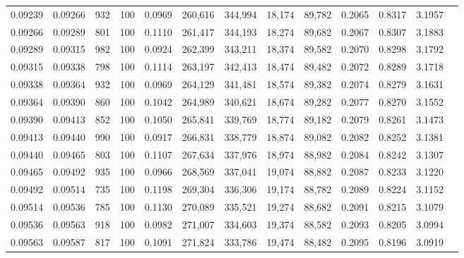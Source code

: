 \begin{tabular}{rrrrrrrrrrrrr}
0.09239 & 0.09266 &   932 & 100 &                                     0.0969 & 260,616 & 344,994 &  18,174 &  89,782 & 0.2065 & 0.8317 & 3.1957 \\
0.09266 & 0.09289 &   801 & 100 &                                     0.1110 & 261,417 & 344,193 &  18,274 &  89,682 & 0.2067 & 0.8307 & 3.1883 \\
0.09289 & 0.09315 &   982 & 100 &                                     0.0924 & 262,399 & 343,211 &  18,374 &  89,582 & 0.2070 & 0.8298 & 3.1792 \\
0.09315 & 0.09338 &   798 & 100 &                                     0.1114 & 263,197 & 342,413 &  18,474 &  89,482 & 0.2072 & 0.8289 & 3.1718 \\
0.09338 & 0.09364 &   932 & 100 &                                     0.0969 & 264,129 & 341,481 &  18,574 &  89,382 & 0.2074 & 0.8279 & 3.1631 \\
0.09364 & 0.09390 &   860 & 100 &                                     0.1042 & 264,989 & 340,621 &  18,674 &  89,282 & 0.2077 & 0.8270 & 3.1552 \\
0.09390 & 0.09413 &   852 & 100 &                                     0.1050 & 265,841 & 339,769 &  18,774 &  89,182 & 0.2079 & 0.8261 & 3.1473 \\
0.09413 & 0.09440 &   990 & 100 &                                     0.0917 & 266,831 & 338,779 &  18,874 &  89,082 & 0.2082 & 0.8252 & 3.1381 \\
0.09440 & 0.09465 &   803 & 100 &                                     0.1107 & 267,634 & 337,976 &  18,974 &  88,982 & 0.2084 & 0.8242 & 3.1307 \\
0.09465 & 0.09492 &   935 & 100 &                                     0.0966 & 268,569 & 337,041 &  19,074 &  88,882 & 0.2087 & 0.8233 & 3.1220 \\
0.09492 & 0.09514 &   735 & 100 &                                     0.1198 & 269,304 & 336,306 &  19,174 &  88,782 & 0.2089 & 0.8224 & 3.1152 \\
0.09514 & 0.09536 &   785 & 100 &                                     0.1130 & 270,089 & 335,521 &  19,274 &  88,682 & 0.2091 & 0.8215 & 3.1079 \\
0.09536 & 0.09563 &   918 & 100 &                                     0.0982 & 271,007 & 334,603 &  19,374 &  88,582 & 0.2093 & 0.8205 & 3.0994 \\
0.09563 & 0.09587 &   817 & 100 &                                     0.1091 & 271,824 & 333,786 &  19,474 &  88,482 & 0.2095 & 0.8196 & 3.0919 \\

\end{tabular}
